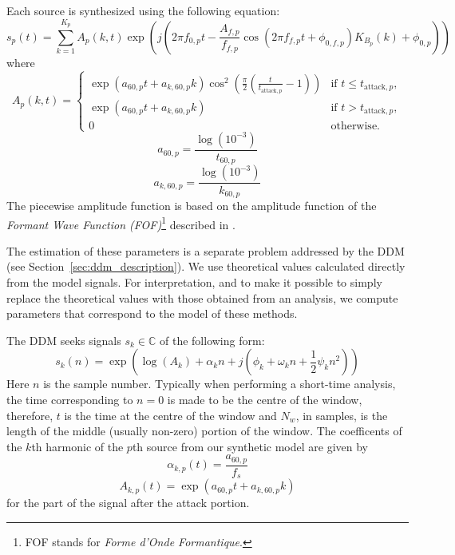 Each source is synthesized using the following equation:
\begin{equation}
    s_{p}(t) = \sum_{k=1}^{K_{p}} A_{p}(k,t) \exp(j(2\pi
    f_{0,p}t - \frac{A_{f,p}}{f_{f,p}} \cos(2\pi f_{f,p} t +
    \phi_{0,f,p}) K_{B_{p}}(k) + \phi_{0,p}))
\end{equation}
where
\begin{equation}
    A_{p}(k,t) = 
    \begin{cases}
        \exp(a_{60,p} t + a_{k,60,p}k) \cos^{2}
        (\frac{\pi}{2}(\frac{t}{t_{\text{attack},p}} - 1)) & \text{if } t \leq
        t_{\text{attack},p},\\
        \exp(a_{60,p} t + a_{k,60,p}k) & \text{if } t > t_{\text{attack},p},\\
        0 & \text{otherwise}.
    \end{cases}
\end{equation}
\begin{equation}
    a_{60,p} = \frac{\log(10^{-3})}{t_{60,p}}
\end{equation}
\begin{equation}
    a_{k,60,p} = \frac{\log(10^{-3})}{k_{60,p}} 
\end{equation}
The piecewise amplitude function is based on the amplitude function of the
\textit{Formant Wave Function (FOF)}\footnote{FOF stands for \textit{Forme
d'Onde Formantique}.} described in \cite[p.~19]{rodet1984chant}.

The estimation of these parameters is a separate problem addressed by the
DDM (see Section~\ref{sec:ddm_description}). We use theoretical values calculated
directly from the model signals. For interpretation, and to make it possible to
simply replace the theoretical values with those obtained from an analysis, we
compute parameters that correspond to the model of these methods.

The DDM seeks signals $s_k \in \mathbb{C}$ of the following form:
\begin{equation}
    s_{k}(n) = \exp(\log(A_{k}) + \alpha_{k}n + j(\phi_{k} + \omega_{k}n +
    \frac{1}{2} \psi_{k} n^{2})) \label{eq:rm_model}
\end{equation}
Here $n$ is the sample number. Typically when performing a short-time analysis,
the time corresponding to $n = 0$ is made to be the centre of the window,
therefore, $t$ is the time at the centre of the window and $N_{w}$, in samples,
is the length of the middle (usually non-zero) portion of the window. The
coefficents of the $k$th harmonic of the $p$th source from our synthetic model
are given by
\begin{equation}
    \alpha_{k,p}(t) = \frac{a_{60,p}}{f_{s}}
\end{equation}
\begin{equation}
    A_{k,p}(t) = \exp(a_{60,p} t + a_{k,60,p} k)
\end{equation}
for the part of the signal after the attack portion.


